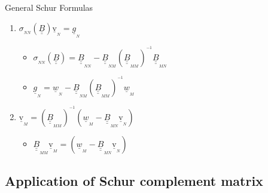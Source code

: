 \documentclass[handout]{beamer}
\newcommand{\Matriz}[1]{\underline{\underline{#1}}}
\newcommand{\Vector}[1]{\underline{#1}}
\newcommand{\SubScript}[1]{_{_{#1}}}
\begin{document}
\begin{frame}{General Schur Formulas}

\begin{center}
\begin{enumerate}
\item  $\displaystyle \boxed{ \sigma\SubScript{NN}(\Matriz{B}) \Vector{\text{v}}\SubScript{N} = \Vector{g}\SubScript{N}}$

\begin{itemize}

\item $\displaystyle
\sigma\SubScript{NN}(\Matriz{B}) = \Matriz{B}\SubScript{NN} - \Matriz{B}\SubScript{NM} (\Matriz{B}\SubScript{MM})^{^{-1}} \Matriz{B}\SubScript{MN}$ 

\item $\Vector{g}\SubScript{N} = \Vector{w}\SubScript{N} - \Matriz{B}\SubScript{NM} (\Matriz{B}\SubScript{MM})^{^{-1}} \Vector{w}\SubScript{M}$
\end{itemize}

\item $\displaystyle \boxed{\Vector{\text{v}}\SubScript{M} = (\Matriz{B}\SubScript{MM})^{^{-1}}(\Vector{w}\SubScript{M} - \Matriz{B}\SubScript{MN}\Vector{\text{v}}\SubScript{N})}$

\begin{itemize}
\item $\Matriz{B}\SubScript{MM} \Vector{\text{v}}\SubScript{M} = (\Vector{w}\SubScript{M} - \Matriz{B}\SubScript{MN}\Vector{\text{v}}\SubScript{N})$
\end{itemize}

\end{enumerate}
\end{center}

\end{frame}

\subsection{Application of Schur complement matrix}
\end{document}
